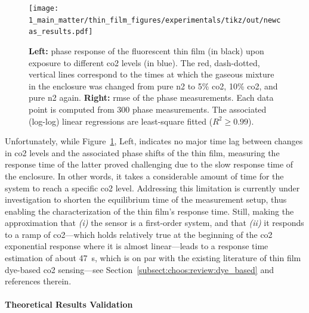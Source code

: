 \begin{figure}
	\centering
	\texttt{[image: 1\_main\_matter/thin\_film\_figures/experimentals/tikz/out/newcas\_results.pdf]}
	\caption[Phase response of the fluorescent thin film upon exposure to different \gls{co2} levels, and evolution of the phase \gls{rmse}.]{\textbf{Left:} phase response of the fluorescent thin film (in black) upon exposure to different \gls{co2} levels (in blue). The red, dash-dotted, vertical lines correspond to the times at which the gaseous mixture in the enclosure was changed from pure \gls{n2} to 5\% \gls{co2}, 10\% \gls{co2}, and pure \gls{n2} again. \textbf{Right:} \gls{rmse} of the phase measurements. Each data point is computed from 300 phase measurements. The associated (log-log) linear regressions are least-square fitted ($R^2 \geq 0.99$).}
	\label{fig:thin_film:experimental:newcas_results}
\end{figure}

Unfortunately, while Figure~\ref{fig:thin_film:experimental:newcas_results}, Left, indicates no major time lag between changes in \gls{co2} levels and the associated phase shifts of the thin film, measuring the response time of the latter proved challenging due to the slow response time of the enclosure. In other words, it takes a considerable amount of time for the system to reach a specific \gls{co2} level. Addressing this limitation is currently under investigation to shorten the equilibrium time of the measurement setup, thus enabling the characterization of the thin film's response time. Still, making the approximation that \textit{(i)} the sensor is a first-order system, and that \textit{(ii)} it responds to a ramp of \gls{co2}---which holds relatively true at the beginning of the \gls{co2} exponential response where it is almost linear---leads to a response time estimation of about 47~s, which is on par with the existing literature of thin film dye-based \gls{co2} sensing---see Section~\ref{subsect:choos:review:dye_based} and references therein.

\paragraph{Theoretical Results Validation}\mbox{}\\

